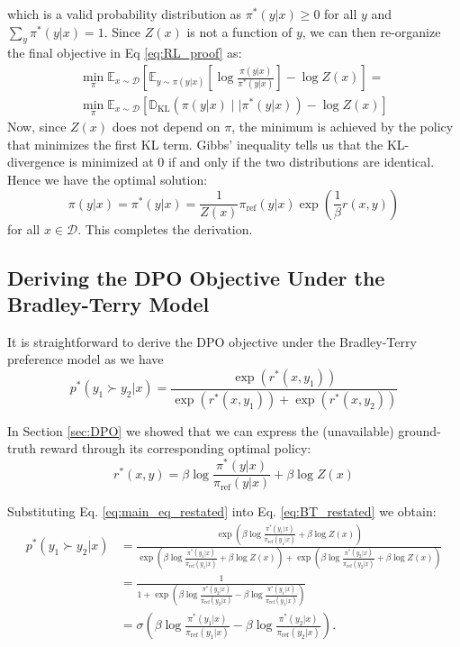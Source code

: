 \documentclass{article}
\newcommand{\piref}{\pi_\text{ref}}
\begin{document}
which is a valid probability distribution as $\pi^*(y|x)\geq 0$ for all $y$ and $\sum_{y}\pi^*(y|x)=1$. Since $Z(x)$ is not a function of $y$, we can then re-organize the final objective in Eq \ref{eq:RL_proof} as:
\begin{align}
\min_{\pi}  \mathbb{E}_{x\sim \mathcal{D}}\left[\mathbb{E}_{y\sim \pi(y|x)}\left[\log\frac{\pi(y|x)}{\pi^*(y|x)}\right] - \log Z(x)\right]=\\
\min_{\pi}\mathbb{E}_{x\sim\mathcal{D}}\left[\mathbb{D}_{\text{KL}}(\pi(y|x)\mid\mid\pi^*(y|x)) - \log Z(x)\right]
\end{align}
Now, since $Z(x)$ does not depend on $\pi$, the minimum is achieved by the policy that minimizes the first KL term. Gibbs' inequality tells us that the KL-divergence is minimized at 0 if and only if the two distributions are identical. Hence we have the optimal solution:
\begin{equation}
    \pi(y|x)= \pi^*(y|x) = \frac{1}{Z(x)}\piref(y|x)\exp\left(\frac{1}{\beta}r(x, y)\right)
\end{equation}
for all $x\in\mathcal{D}$. This completes the derivation.

\label{app:derivation1}



\subsection{Deriving the DPO Objective Under the Bradley-Terry Model}
\label{app:derivation2}
It is straightforward to derive the DPO objective under the Bradley-Terry  preference model as we have
\begin{equation}\label{eq:BT_restated}
    p^*(y_1\succ y_2|x)=\frac{\exp\left(r^*(x, y_1)\right)}{\exp\left(r^*(x, y_1)\right) + \exp\left(r^*(x, y_2)\right)}
\end{equation}

In Section \ref{sec:DPO} we showed that we can express the (unavailable) ground-truth reward through its corresponding optimal policy:
\begin{equation}\label{eq:main_eq_restated}
    r^*(x,y) =\beta \log \frac{\pi^*(y|x)}{\piref(y|x)} + \beta \log Z(x)
\end{equation}

Substituting Eq. \ref{eq:main_eq_restated} into Eq. \ref{eq:BT_restated} we obtain:
\begin{align*}
    p^*(y_1\succ y_2|x)&=\frac{\exp\left(\beta \log \frac{\pi^*(y_1|x)}{\piref(y_1|x)} + \beta \log Z(x)\right)}{\exp\left(\beta \log \frac{\pi^*(y_1|x)}{\piref(y_1|x)} + \beta \log Z(x)\right) + \exp\left(\beta \log \frac{\pi^*(y_2|x)}{\piref(y_2|x)} + \beta \log Z(x)\right)}\\ &=
    \frac{1}{1+\exp\left(\beta \log \frac{\pi^*(y_2|x)}{\piref(y_2|x)}-\beta \log \frac{\pi^*(y_1|x)}{\piref(y_1|x)}\right)} \\&= \sigma\left(\beta \log \frac{\pi^*(y_1|x)}{\piref(y_1|x)} - \beta \log \frac{\pi^*(y_2|x)}{\piref(y_2|x)}\right).
\end{align*}
\end{document}
